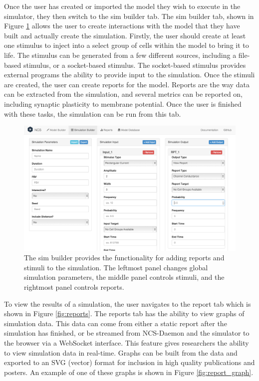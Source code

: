 Once the user has created or imported the model they wish to execute in the simulator, they then switch to the sim builder tab. The sim builder tab, shown in Figure \ref{fig:sim_builder} allows the user to create interactions with the model that they have built and actually create the simulation. Firstly, the user should create at least one stimulus to inject into a select group of cells within the model to bring it to life. The stimulus can be generated from a few different sources, including a file-based stimulus, or a socket-based stimulus. The socket-based stimulus provides external programs the ability to provide input to the simulation. Once the stimuli are created, the user can create reports for the model. Reports are the way data can be extracted from the simulation, and several metrics can be reported on, including synaptic plasticity to membrane potential. Once the user is finished with these tasks, the simulation can be run from this tab.

\begin{figure}
\begin{center}
\includegraphics[height=\textheight,width=5in,keepaspectratio]{figures/sim_builder.png}
\caption[Sim Builder]{The sim builder provides the functionality for adding reports and stimuli to the simulation. The leftmost panel changes global simulation parameters, the middle panel controls stimuli, and the rightmost panel controls reports.\label{fig:sim_builder}}
\end{center}
\end{figure}

To view the results of a simulation, the user navigates to the report tab which is shown in Figure \ref{fig:reports}. The reports tab has the ability to view graphs of simulation data. This data can come from either a static report after the simulation has finished, or be streamed from NCS-Daemon and the simulator to the browser via a WebSocket interface. This feature gives researchers the ability to view simulation data in real-time. Graphs can be built from the data and exported to an SVG (vector) format for inclusion in high quality publications and posters. An example of one of these graphs is shown in Figure \ref{fig:report_graph}.

